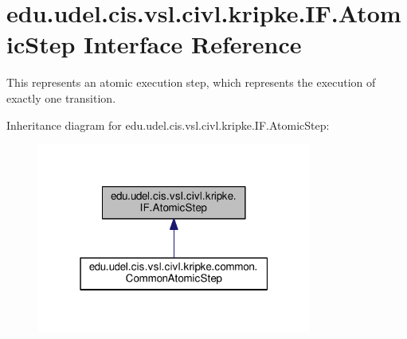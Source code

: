 \hypertarget{interfaceedu_1_1udel_1_1cis_1_1vsl_1_1civl_1_1kripke_1_1IF_1_1AtomicStep}{}\section{edu.\+udel.\+cis.\+vsl.\+civl.\+kripke.\+I\+F.\+Atomic\+Step Interface Reference}
\label{interfaceedu_1_1udel_1_1cis_1_1vsl_1_1civl_1_1kripke_1_1IF_1_1AtomicStep}


This represents an atomic execution step, which represents the execution of exactly one transition.  




Inheritance diagram for edu.\+udel.\+cis.\+vsl.\+civl.\+kripke.\+I\+F.\+Atomic\+Step\+:
\nopagebreak
\begin{figure}[H]
\begin{center}
\leavevmode
\includegraphics[width=256pt]{interfaceedu_1_1udel_1_1cis_1_1vsl_1_1civl_1_1kripke_1_1IF_1_1AtomicStep__inherit__graph}
\end{center}
\end{figure}
